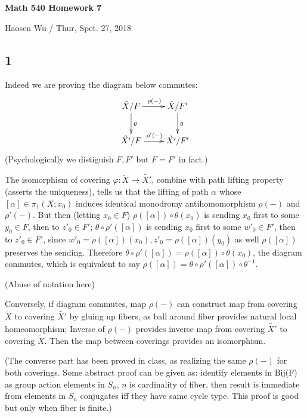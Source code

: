 \documentclass[11pt]{article}
\theoremstyle{remark}
\begin{document}
\begin{center}
    \begin{Large} {\bf Math 540 Homework 7}\\
    \end{Large}
    Haosen Wu  / Thur, Spet. 27, 2018
\end{center}

\subsection*{1}
    Indeed we are proving the diagram below commutes:
    \[
    \xymatrix{
    & \tilde{X}/F \ar[d]^{\theta}  \ar[r]^{\rho(-)} & \Tilde{X}/F' \ar[d]^{\theta} &  \\
    & \tilde{X'}/F  \ar[r]^{\rho'(-)} & \Tilde{X'}/F' &
    }
    \]
    (Psychologically we distiguish $F,F'$ but $F=F'$ in fact.)
    
    The isomorphism of covering $\varphi: \tilde{X}\rightarrow \tilde{X'}$, combine with path lifting property (asserts the uniqueness), tells us that the lifting of path $\alpha$ whose $[\alpha] \in \pi_1(X;x_0)$ induces identical monodromy antihomomorphism $\rho(-)$ and $\rho'(-)$. But then (letting $x_0\in F$) $\rho([\alpha])\circ \theta(x_0)$ is sending $x_0$ first to some $y_0\in F$, then to $z'_0\in F'$; $\theta \circ \rho ' ([\alpha])$ is sending $x_0$ first to some $w'_0\in F'$, then to $z'_0\in F'$, since $w'_0=\rho([\alpha])(x_0),z'_0=\rho([\alpha])(y_0)$ as well $\rho([\alpha])$ preserves the sending. Therefore $ \theta \circ \rho ' ([\alpha]) = \rho([\alpha])\circ \theta(x_0)$, the diagram commutes, which is equivalent to say $\rho ([\alpha])=\theta \circ \rho ' ([\alpha]) \circ \theta^{-1}$.
    
    (Abuse of notation here)  
    
    Conversely, if diagram commutes, map $\rho(-)$ can construct map from covering $\tilde{X}$ to covering $\tilde{X'}$ by gluing up fibers, as ball around fiber provides natural local homeomorphism; Inverse of $\rho(-)$ provides inverse map from covering $\tilde{X'}$ to covering $\tilde{X}$. Then the map between coverings provides an  isomorphism.
    
    (The converse part has been proved in class, as realizing the same $\rho(-)$ for both coverings. Some abstract proof can be given as: identify elements in Bij(F) as group action elements in $S_n$, $n$ is cardinality of fiber, then result is immediate from elements in $S_n$ conjugates iff they have same cycle type. This proof is good but only when fiber is finite.) 
    
\end{document}
